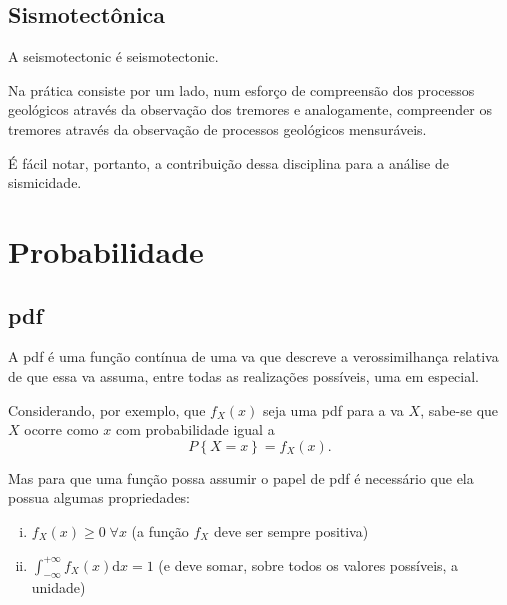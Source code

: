 \subsection{Sismotectônica}
\label{sec:sismotectonica}

A \gls{seismotectonic} é \glsdesc*{seismotectonic}. 

Na prática consiste por um lado, num esforço de compreensão dos
processos geológicos através da observação dos tremores e analogamente, compreender os tremores através da observação
de processos geológicos mensuráveis.  

É fácil notar, portanto, a contribuição dessa disciplina para a análise de sismicidade.







\section{Probabilidade}
\label{sec:probabilidade}



\subsection{\Glsdesc{pdf}}
\label{sec:pdf}

A \gls{pdf} é uma função contínua de uma \gls{va}  
que descreve a verossimilhança relativa de que essa \gls{va} 
assuma, entre todas as realizações possíveis, uma em especial.

Considerando, por exemplo, que $f_X(x)$ seja uma \gls{pdf} para a \gls{va} $X$, 
sabe-se que $X$ ocorre como $x$ com probabilidade igual a
\begin{equation}
	P \left\{ X = x\right\} = f_X(x).
	\label{eq:pdf}
\end{equation}

Mas para que uma função possa assumir o papel de \gls{pdf} é necessário que ela
possua algumas propriedades:
\begin{enumerate}[(i)]
	\item $f_X(x) \ge 0\;\forall x$  (a função $f_X$ deve ser sempre positiva)
	\item $\int_{-\infty}^{+\infty} f_X(x) \mathrm{d}x = 1$ (e deve somar, sobre todos os valores possíveis, a unidade)
\end{enumerate}


